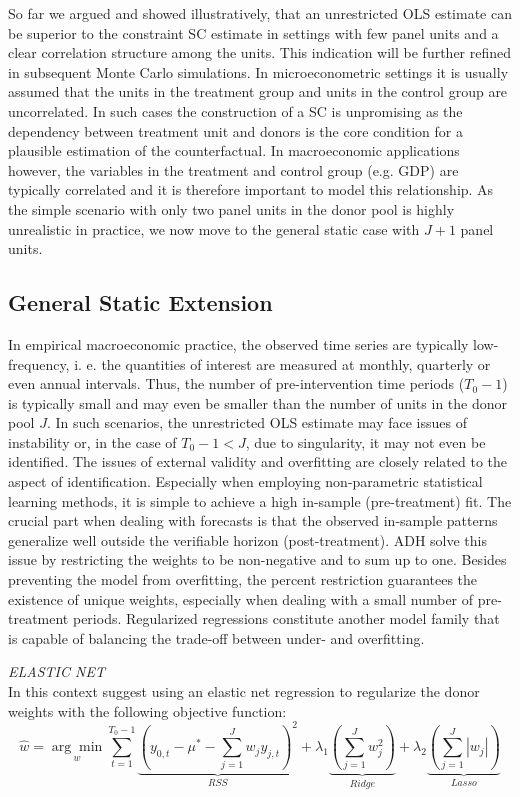 So far we argued and showed illustratively, that an unrestricted \ac{OLS} estimate can be superior to the constraint \ac{SC} estimate in settings with few panel units and a clear correlation structure among the units. This indication will be further refined in subsequent Monte Carlo simulations. In microeconometric settings it is usually assumed that the units in the treatment group and units in the control group are uncorrelated. In such cases the construction of a \ac{SC} is unpromising as the dependency between treatment unit and donors is the core condition for a plausible estimation of the counterfactual. In macroeconomic applications however, the variables in the treatment and control group (e.g. \ac{GDP}) are typically correlated and it is therefore important to model this relationship. As the simple scenario with only two panel units in the donor pool is highly unrealistic in practice, we now move to the general static case with $J+1$ panel units.
\subsection{General Static Extension}
In empirical macroeconomic practice, the observed time series are typically low-frequency, i. e.
the quantities of interest are measured at monthly, quarterly or even annual intervals. Thus, the number of pre-intervention time periods ($T_0 - 1$) is typically small and may even be smaller than the number of units in the donor pool $J$. In such scenarios, the unrestricted \ac{OLS} estimate may face issues of instability or, in the case of $T_0 - 1 < J$, due to singularity, it may not even be identified.
The issues of external validity and overfitting are closely related to the aspect of identification. Especially when employing non-parametric statistical learning methods, it is simple to achieve a high in-sample (pre-treatment) fit. The crucial part when dealing with forecasts is that the observed in-sample patterns generalize well outside the verifiable horizon (post-treatment). \ac{ADH} solve this issue by restricting the weights to be non-negative and to sum up to one. Besides preventing the model from overfitting, the percent restriction guarantees the existence of unique weights, especially when dealing with a small number of pre-treatment periods. Regularized regressions constitute another model family that is capable of balancing the trade-off between under- and overfitting. 

\textit{ELASTIC NET} \\
In this context \cite{doudchenko:2016} suggest using an elastic net regression to regularize the donor weights with the following objective function:
\[
\widehat{w} = 
\underset{w}{\arg\min}
\sum_{t=1}^{T_0-1}\underbrace{\left(y_{0,t} - \mu^* - \sum_{j = 1}^{J} w_j y_{j,t} \right)^2}_{RSS} + \lambda_1 \underbrace{\left( \sum_{j = 1}^{J} w_j^2 \right)}_{Ridge} + 
\lambda_2 \underbrace{\left( \sum_{j = 1}^{J} |w_j| \right)  }_{Lasso}
\]

